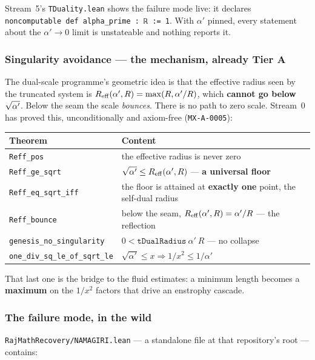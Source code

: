 \documentclass[11pt,a4paper]{article}
\begin{document}
Stream~5's \texttt{TDuality.lean} shows the failure mode live: it declares
\texttt{noncomputable def alpha_prime : ℝ := 1}. With $\alpha'$ pinned, every statement about the
$\alpha' \to 0$ limit is unstateable and nothing reports it.

\subsubsection{Singularity avoidance — the mechanism, already Tier A}

The dual-scale programme's geometric idea is that the effective radius seen by the truncated
system is $R_{\mathrm{eff}}\!\left(\alpha',R\right) = \max(R, \alpha'/R)$, which \textbf{cannot go below $\sqrt{\alpha'}$}. Below
the seam the scale \emph{bounces}. There is no path to zero scale. Stream~0 has proved this,
unconditionally and axiom-free (\texttt{MX-A-0005}):

\begin{center}\small
\begin{tabular}{@{}lp{9.2cm}@{}}
\toprule
Theorem & Content \\
\midrule
\texttt{Reff_pos}                 & the effective radius is never zero \\
\texttt{Reff_ge_sqrt}             & $\sqrt{\alpha'} \le R_{\mathrm{eff}}\!\left(\alpha',R\right)$ — \textbf{a universal floor} \\
\texttt{Reff_eq_sqrt_iff}         & the floor is attained at \textbf{exactly one} point, the self-dual radius \\
\texttt{Reff_bounce}              & below the seam, $R_{\mathrm{eff}}\!\left(\alpha',R\right) = \alpha'/R$ — the reflection \\
\texttt{genesis_no_singularity}   & $0 < \texttt{tDualRadius}\ \alpha'\ R$ — no collapse \\
\texttt{one_div_sq_le_of_sqrt_le} & $\sqrt{\alpha'} \le x \Rightarrow 1/x^2 \le 1/\alpha'$ \\
\bottomrule
\end{tabular}
\end{center}

That last one is the bridge to the fluid estimates: a minimum length becomes a \textbf{maximum}
on the $1/x^2$ factors that drive an enstrophy cascade.

\subsubsection{The failure mode, in the wild}

\texttt{RajMathRecovery/NAMAGIRI.lean} — a standalone file at that repository's root — contains:
\end{document}

